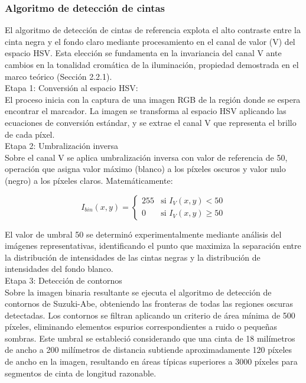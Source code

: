 \subsubsection{Algoritmo de detección de cintas}

El algoritmo de detección de cintas de referencia explota el alto contraste entre la cinta negra y el fondo claro mediante procesamiento en el canal de valor (V) del espacio HSV. Esta elección se fundamenta en la invariancia del canal V ante cambios en la tonalidad cromática de la iluminación, propiedad demostrada en el marco teórico (Sección 2.2.1).\\

Etapa 1: Conversión al espacio HSV:\\
\noindent
El proceso inicia con la captura de una imagen RGB de la región donde se espera encontrar el marcador. La imagen se transforma al espacio HSV aplicando las ecuaciones de conversión estándar, y se extrae el canal V que representa el brillo de cada píxel.\\

Etapa 2: Umbralización inversa\\
\noindent
Sobre el canal V se aplica umbralización inversa con valor de referencia de 50, operación que asigna valor máximo (blanco) a los píxeles oscuros y valor nulo (negro) a los píxeles claros. Matemáticamente:

\begin{equation}
I_{bin}(x,y) = \begin{cases}
255 & \text{si } I_V(x,y) < 50 \\
0 & \text{si } I_V(x,y) \geq 50
\end{cases}
\end{equation}

El valor de umbral 50 se determinó experimentalmente mediante análisis del imágenes representativas, identificando el punto que maximiza la separación entre la distribución de intensidades de las cintas negras y la distribución de intensidades del fondo blanco.\\

Etapa 3: Detección de contornos\\
\noindent
Sobre la imagen binaria resultante se ejecuta el algoritmo de detección de contornos de Suzuki-Abe, obteniendo las fronteras de todas las regiones oscuras detectadas. Los contornos se filtran aplicando un criterio de área mínima de 500 píxeles, eliminando elementos espurios correspondientes a ruido o pequeñas sombras. Este umbral se estableció considerando que una cinta de 18 milímetros de ancho a 200 milímetros de distancia subtiende aproximadamente 120 píxeles de ancho en la imagen, resultando en áreas típicas superiores a 3000 píxeles para segmentos de cinta de longitud razonable.

